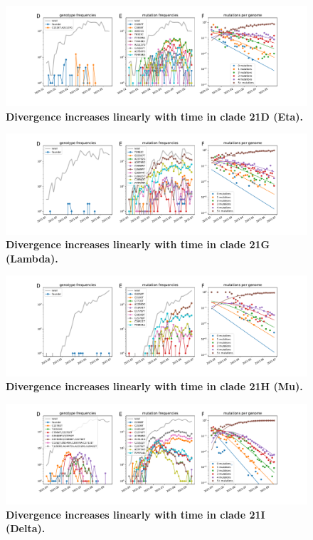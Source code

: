 \begin{figure}
    \includegraphics[width=\textwidth]{figures/counts/21D_counts.pdf}
    \caption{{\bf Divergence increases linearly with time in clade 21D (Eta).}
    \label{fig:21D_counts}}
\end{figure}


\begin{figure}
    \includegraphics[width=\textwidth]{figures/counts/21G_counts.pdf}
    \caption{{\bf Divergence increases linearly with time in clade 21G (Lambda).}
    \label{fig:21G_counts}}
\end{figure}


\begin{figure}
    \includegraphics[width=\textwidth]{figures/counts/21H_counts.pdf}
    \caption{{\bf Divergence increases linearly with time in clade 21H (Mu).}
    \label{fig:21H_counts}}
\end{figure}



\begin{figure}
    \includegraphics[width=\textwidth]{figures/counts/21I_counts.pdf}
    \caption{{\bf Divergence increases linearly with time in clade 21I (Delta).}
    \label{fig:21I_counts}}
\end{figure}


